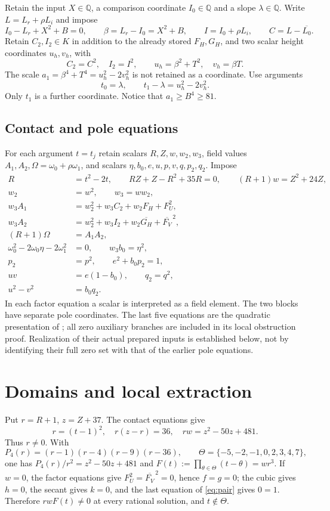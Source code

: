 \documentclass[11pt,a4paper]{article}
\newcommand{\Q}{\mathbb Q}\newcommand{\Z}{\mathbb Z}\DeclareMathOperator{\Tr}{Tr}\DeclareMathOperator{\Nm}{Nm}\DeclareMathOperator{\rad}{rad}
\begin{document}
Retain the input $X\in\Q$, a comparison coordinate $I_0\in\Q$ and a
slope $\lambda\in\Q$. Write $L=L_r+\rho L_i$ and impose
\[
 I_0-L_r+X^2+B=0,
 \qquad \beta=L_r-I_0=X^2+B,
 \qquad I=I_0+\rho L_i,
 \qquad C=L-\overline{L_0}.
\]
Retain $C_2,I_2\in K$ in addition to the already stored $F_H,G_H$, and two scalar height coordinates
$u_h,v_h$, with
\[
 C_2=C^2,\quad I_2=I^2,
 \qquad u_h=\beta^2+T^2,\quad v_h=\beta T.
\]
The scale $a_1=\beta^4+T^4=u_h^2-2v_h^2$ is not retained as a
coordinate. Use arguments
\begin{equation}\label{eq:arguments}
            t_0=\lambda,\qquad t_1-\lambda=u_h^2-2v_h^2.
\end{equation}
Only $t_1$ is a further coordinate. Notice that $a_1\ge B^4\ge81$.

\subsection{Contact and pole equations}
For each argument $t=t_j$ retain scalars $R,Z,w,w_2,w_3$, field
values $A_1,A_2,\Omega=\omega_0+\rho\omega_1$, and scalars
$\eta,b_0,e,u,p,v,q,p_2,q_2$. Impose
\begin{align}
 R&=t^2-2t,\qquad RZ+Z-R^2+35R=0,\qquad (R+1)w=Z^2+24Z,\\
 w_2&=w^2,\qquad w_3=ww_2,\\
 w_3A_1&=w_2^2+w_3C_2+w_2F_H+F_U^2,\\
 w_3A_2&=w_2^2+w_3I_2+w_2\overline{G_H}+\overline{F_V}^{\,2},\\
 (R+1)\Omega&=A_1A_2,\\
 \omega_0^2-2\omega_0\eta-2\omega_1^2&=0,\qquad w_3b_0=\eta^2,\\
 p_2&=p^2,\qquad e^2+b_0p_2=1,\\
 uv&=e(1-b_0),\qquad q_2=q^2,\\
 u^2-v^2&=b_0q_2.\label{eq:blocks}
\end{align}
In each factor equation a scalar is interpreted as a field element.
The two blocks have separate pole coordinates. The last five equations
are the quadratic presentation of \cite{Pole}; all zero auxiliary
branches are included in its local obstruction proof. Realization of
their actual prepared inputs is established below, not by identifying
their full zero set with that of the earlier pole equations.

\section{Domains and local extraction}
Put $r=R+1$, $z=Z+37$. The contact equations give
\[
 r=(t-1)^2,\quad r(z-r)=36,\quad rw=z^2-50z+481.
\]
Thus $r\ne0$. With
\[
 P_4(r)=(r-1)(r-4)(r-9)(r-36),\qquad
 \Theta=\{-5,-2,-1,0,2,3,4,7\},
\]
one has $P_4(r)/r^2=z^2-50z+481$ and
$F(t):=\prod_{\theta\in\Theta}(t-\theta)=wr^3$.
If $w=0$, the factor equations give $F_U^2=\overline{F_V}^{\,2}=0$,
hence $f=g=0$; the cubic gives $h=0$, the secant gives $k=0$, and
the last equation of \eqref{eq:pair} gives $0=1$. Therefore
$r w F(t)\ne0$ at every rational solution, and $t\notin\Theta$.
\end{document}

